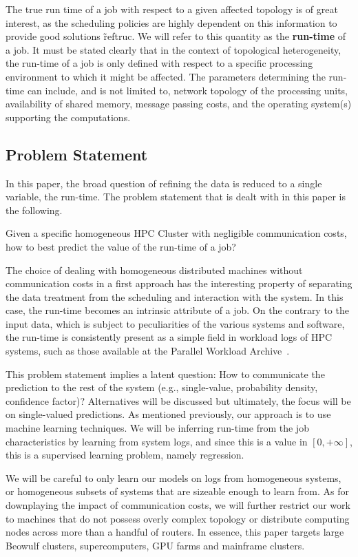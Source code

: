 \documentclass{article}
\begin{document}
The true run time of a job with respect to a given affected topology is of great interest, as the scheduling policies are highly dependent on this information to provide good solutions \~ref{truc}. We will refer to this quantity as the \textbf{run-time} of a job.
It must be stated clearly that in the context of topological heterogeneity, the run-time of a job is only defined with respect to a specific processing environment to which it might be affected.
The parameters determining the run-time can include, and is not limited to, network topology of the processing units, availability of shared memory, message passing costs, and the operating system(s) supporting the computations.

\subsection{Problem Statement}
In this paper, the broad question of refining the data is reduced to a single variable, the run-time. The problem statement that is dealt with in this paper is the following.

Given a specific homogeneous HPC Cluster with negligible communication costs, how to best predict the value of the run-time of a job?

The choice of dealing with homogeneous distributed machines without communication costs in a first approach has the interesting property of separating the data treatment from the scheduling and interaction with the system.
In this case, the run-time becomes an intrinsic attribute of a job.
On the contrary to the input data, which is subject to peculiarities of the various systems and software, the run-time is consistently present as a simple field in workload logs of HPC systems, such as those available at the Parallel Workload Archive~\cite{workloadarchive}.

This problem statement implies a latent question: How to communicate the prediction to the rest of the system (e.g., single-value, probability density, confidence factor)? Alternatives will be discussed but ultimately, the focus will be on single-valued predictions.
As mentioned previously, our approach is to use machine learning techniques. We will be inferring run-time from the job characteristics by learning from system logs, and since this is a value in $[0,+\infty ]$, this is a supervised learning problem, namely regression.

We will be careful to only learn our models on logs from homogeneous systems, or homogeneous subsets of systems that are sizeable enough to learn from.
As for downplaying the impact of communication costs, we will further restrict our work to machines that do not possess overly complex topology or distribute computing nodes across more than a handful of routers.
In essence, this paper targets large Beowulf clusters, supercomputers, GPU farms and mainframe clusters.
\end{document}
